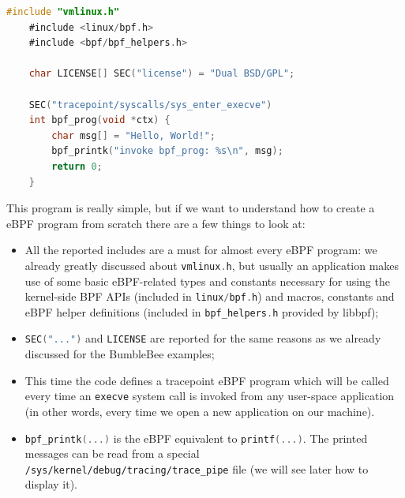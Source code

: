 \begin{lstlisting}[style=cstyle, language=C, caption={``Hello world!'' kernel side program using libbpf-bootstrap}, title=example\_helloworld.bpf.c]
	#include "vmlinux.h"
	#include <linux/bpf.h>
	#include <bpf/bpf_helpers.h>
	
	char LICENSE[] SEC("license") = "Dual BSD/GPL";
	
	SEC("tracepoint/syscalls/sys_enter_execve")
	int bpf_prog(void *ctx) {
		char msg[] = "Hello, World!";
		bpf_printk("invoke bpf_prog: %s\n", msg);
		return 0;
	}
\end{lstlisting}

This program is really simple, but if we want to understand how to create a eBPF program from scratch there are a few things to look at:

\begin{itemize}
	\item 
		All the reported includes are a must for almost every eBPF program: we already	greatly discussed about \colorbox{backcolour}{\lstinline[style=cstyle, language=C]|vmlinux.h|}, but usually an application makes use of some basic eBPF-related types and constants necessary for using the kernel-side BPF APIs (included in \colorbox{backcolour}{\lstinline[style=cstyle, language=C]|linux/bpf.h|}) and macros, constants and eBPF helper definitions (included in \colorbox{backcolour}{\lstinline[style=cstyle, language=C]|bpf_helpers.h|} provided by libbpf);
	\item 
		\colorbox{backcolour}{\lstinline[style=cstyle, language=C]|SEC("...")|} and \colorbox{backcolour}{\lstinline[style=cstyle, language=C]|LICENSE|} are reported for the same reasons as we already discussed for the BumbleBee examples;
	\item 
		This time the code defines a tracepoint eBPF program which will be called every time an \colorbox{backcolour}{\lstinline[style=highlight, language=bash]|execve|} system call is invoked from any user-space application (in other words, every time we open a new application on our machine).
	\item 
		\colorbox{backcolour}{\lstinline[style=cstyle, language=C]|bpf_printk(...)|} is the eBPF equivalent to \colorbox{backcolour}{\lstinline[style=cstyle, language=C]|printf(...)|}. 
		The printed messages can be read from a special \colorbox{backcolour}{\lstinline[style=highlight, language=bash]|/sys/kernel/debug/tracing/trace_pipe|} file (we will see later how to display it).
\end{itemize}

